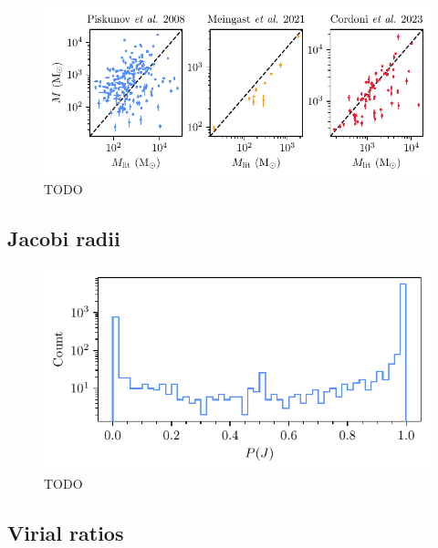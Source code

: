 \begin{figure}[t]
    \centering
    \includegraphics[width=\textwidth]{fig/c4/results_mass_comparison.pdf}
    \caption[TODO]{TODO}
    \label{fig:dynamics:results:mass_comparison}
\end{figure}


\subsection{Jacobi radii}
\label{sec:dynamics:results:radii}

\begin{figure}[t]
    \centering
    \includegraphics[width=\textwidth]{fig/c4/results_p_jac_distribution.pdf}
    \caption[TODO]{TODO}
    \label{fig:dynamics:results:jacobi_radii_distribution}
\end{figure}


\subsection{Virial ratios}
\label{sec:dynamics:results:virial}

